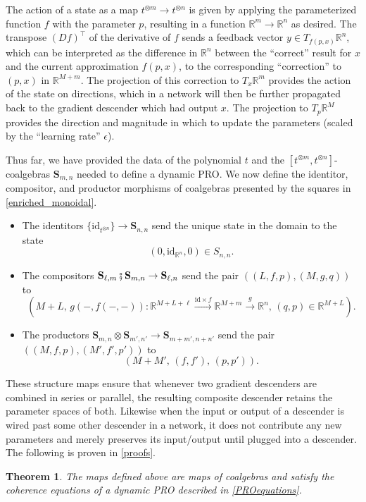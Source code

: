 \documentclass{eptcs}
\theoremstyle{definition}
\theoremstyle{plain}
\newtheorem{theorem}[definitionx]{Theorem}
\newcommand{\Cat}[1]{\textbf{#1}}%
\newcommand{\id}{\mathrm{id}}
\newcommand{\then}{\mathbin{\fatsemi}}
\newcommand{\To}[2][]{\xrightarrow[#1]{#2}}
\newcommand{\rr}{\mathbb{R}}
\newcommand{\0}{\textsf{0}}
\newcommand{\1}{\tn{\textsf{1}}}
\renewcommand{\S}{{\Cat{S}}}
\newcommand{\idcoalg}[1]{{\{\id_{#1}\}}}
\begin{document}
The action of a state as a map $t^{\otimes m} \to t^{\otimes n}$ is given by applying the parameterized function $f$ with the parameter $p$, resulting in a function $\rr^m \to \rr^n$ as desired. The transpose $(Df)^\top$ of the derivative of $f$ sends a feedback vector $y \in T_{f(p,x)} \rr^n$, which can be interpreted as the difference in $\rr^n$ between the ``correct'' result for $x$ and the current approximation $f(p,x)$, to the corresponding ``correction'' to $(p,x)$ in $\rr^{M+m}$. The projection of this correction to $T_x \rr^m$ provides the action of the state on directions, which in a network will then be further propagated back to the gradient descender which had output $x$. The projection to $T_p \rr^M$ provides the direction and magnitude in which to update the parameters (scaled by the ``learning rate'' $\epsilon$).

Thus far, we have provided the data of the polynomial $t$ and the $[t^{\otimes m},t^{\otimes n}]$-coalgebras $\S_{m,n}$ needed to define a dynamic PRO. We now define the identitor, compositor, and productor morphisms of coalgebras presented by the squares in \cref{enriched_monoidal}.
\begin{itemize}
	\item The identitors $\idcoalg{t^{\otimes n}} \to \S_{n,n}$ send the unique state in the domain to the state 
\[(0,\id_{\rr^n},0) \in S_{n,n}.\] 
	\item The compositors $\S_{\ell,m}\then\S_{m,n} \to \S_{\ell,n}$ send the pair $((L,f,p),(M,g,q))$ to 
\[\left( M+L,\,g(-,f(-,-))\colon \rr^{M+L+\ell} \To{\id \times f} \rr^{M+m} \To{g} \rr^n,\, (q,p) \in \rr^{M+L} \right).\]
	\item The productors $\S_{m,n} \otimes \S_{m',n'} \to \S_{m+m',n+n'}$ send the pair $((M,f,p),(M',f',p'))$ to 
\[(M+M',\,(f,f'),\,(p,p')).\]
\end{itemize}

These structure maps ensure that whenever two gradient descenders are combined in series or parallel, the resulting composite descender retains the parameter spaces of both. Likewise when the input or output of a descender is wired past some other descender in a network, it does not contribute any new parameters and merely preserves its input/output until plugged into a descender. The following is proven in \cref{proofs}.

\begin{theorem}\label{gradientadaptive}
The maps defined above are maps of coalgebras and satisfy the coherence equations of a dynamic PRO described in \cref{PROequations}.
\end{theorem}
\end{document}

